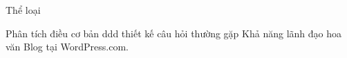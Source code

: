 Thể loại

Phân tích
điều cơ bản
ddd
thiết kế
câu hỏi thường gặp
Khả năng lãnh đạo
hoa văn
Blog tại WordPress.com.







